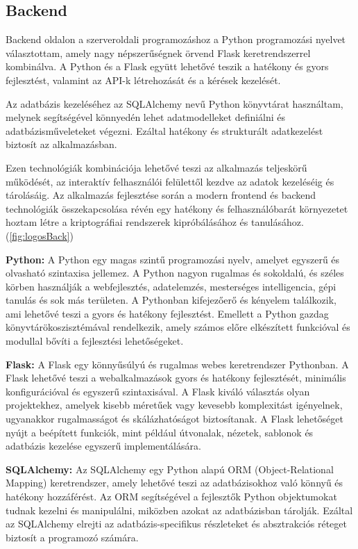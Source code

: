 \newpage
\subsection{Backend}

Backend oldalon a szerveroldali programozáshoz a Python programozási nyelvet választottam, amely nagy népszerűségnek örvend Flask keretrendszerrel kombinálva. A Python és a Flask együtt lehetővé teszik a hatékony és gyors fejlesztést, valamint az API-k létrehozását és a kérések kezelését.

Az adatbázis kezeléséhez az SQLAlchemy nevű Python könyvtárat használtam, melynek segítségével könnyedén lehet adatmodelleket definiálni és adatbázisműveleteket végezni. Ezáltal hatékony és strukturált adatkezelést biztosít az alkalmazásban.

Ezen technológiák kombinációja lehetővé teszi az alkalmazás teljeskörű működését, az interaktív felhasználói felülettől kezdve az adatok kezeléséig és tárolásáig. Az alkalmazás fejlesztése során a modern frontend és backend technológiák összekapcsolása révén egy hatékony és felhasználóbarát környezetet hoztam létre a kriptográfiai rendszerek kipróbálásához és tanulásához.  (\ref{fig:logosBack})

\vspace{10pt}
\textbf {Python:}
A Python egy magas szintű programozási nyelv, amelyet egyszerű és olvasható szintaxisa jellemez. A Python nagyon rugalmas és sokoldalú, és széles körben használják a webfejlesztés, adatelemzés, mesterséges intelligencia, gépi tanulás és sok más területen. A Pythonban kifejezőerő és kényelem találkozik, ami lehetővé teszi a gyors és hatékony fejlesztést. Emellett a Python gazdag könyvtárökoszisztémával rendelkezik, amely számos előre elkészített funkcióval és modullal bővíti a fejlesztési lehetőségeket.

\vspace{10pt}
\textbf {Flask:}
A Flask egy könnyűsúlyú és rugalmas webes keretrendszer Pythonban. A Flask lehetővé teszi a webalkalmazások gyors és hatékony fejlesztését, minimális konfigurációval és egyszerű szintaxisával. A Flask kiváló választás olyan projektekhez, amelyek kisebb méretűek vagy kevesebb komplexitást igényelnek, ugyanakkor rugalmasságot és skálázhatóságot biztosítanak. A Flask lehetőséget nyújt a beépített funkciók, mint például útvonalak, nézetek, sablonok és adatbázis kezelése egyszerű implementálására.

\vspace{10pt}
\textbf {SQLAlchemy:}
Az SQLAlchemy egy Python alapú ORM (Object-Relational Mapping) keretrendszer, amely lehetővé teszi az adatbázisokhoz való könnyű és hatékony hozzáférést. Az ORM segítségével a fejlesztők Python objektumokat tudnak kezelni és manipulálni, miközben azokat az adatbázisban tárolják. Ezáltal az SQLAlchemy elrejti az adatbázis-specifikus részleteket és absztrakciós réteget biztosít a programozó számára.

